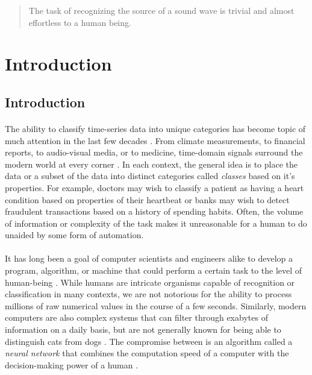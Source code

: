 \documentclass[12pt,letterpaper]{article}
\begin{document}
\begin{abstract}

The task of recognizing the source of a sound wave is trivial and almost effortless to a human being. 

\end{abstract}

\newpage
\section{Introduction}
\label{sec-Introduction}


\subsection{Introduction}

\paragraph*{}The ability to classify time-series data into unique categories has become topic of much attention in the last few decades \cite{Khan,Mierswa}. From climate measurements, to financial reports, to audio-visual media, or to medicine, time-domain signals surround the modern world at every corner \cite{Virtanen}. In each context, the general idea is to place the data or a subset of the data into distinct categories called \textit{classes} based on it's properties. For example, doctors may wish to classify a patient as having a heart condition based on properties of their heartbeat or banks may wish to detect fraudulent transactions based on a history of spending habits. Often, the volume  of information or complexity of the task makes it unreasonable for a human to do unaided by some form of automation.

\paragraph*{}It has long been a goal of computer scientists and engineers alike to develop a program, algorithm, or machine that could perform a certain task to the level of human-being \cite{Bishop,Geron,Loy}. While humans are intricate organisms capable of recognition or classification in many contexts, we are not notorious for the ability to process millions of raw numerical values in the course of a few seconds. Similarly, modern computers are also complex systems that can filter through exabytes of information on a daily basis, but are not generally known for being able to distinguish cats from dogs \cite{Geron}. The compromise between is an algorithm called a \textit{neural network} that combines the computation speed of a computer with the decision-making power of a human \cite{Goodfellow,Levine,Loy}.
\end{document}
